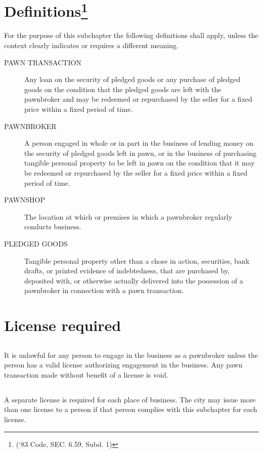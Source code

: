 
\setcounter{section}{29}
\section{Definitions\footnote{(‘83 Code, SEC. 6.59, Subd. 1)}}
For the purpose of this subchapter the following definitions shall apply, unless the context clearly indicates or requires a different meaning.
\begin{description}
    \item[PAWN TRANSACTION] Any loan on the security of pledged goods or any purchase of pledged goods on the condition that the pledged goods are left with the pawnbroker and may be redeemed or repurchased by the seller for a fixed price within a fixed period of time.
    \item[PAWNBROKER] A person engaged in whole or in part in the business of lending money on the security of pledged goods left in pawn, or in the business of purchasing tangible personal property to be left in pawn on the condition that it may be redeemed or repurchased by the seller for a fixed price within a fixed period of time.
    \item[PAWNSHOP] The location at which or premises in which a pawnbroker regularly conducts business.
    \item[PLEDGED GOODS] Tangible personal property other than a chose in action, securities, bank drafts, or printed evidence of indebtedness, that are purchased by, deposited with, or otherwise actually delivered into the possession of a pawnbroker in connection with a pawn transaction.
\end{description}

\section{License required}
\subsection{}
It is unlawful for any person to engage in the business as a pawnbroker unless the person has a valid license authorizing engagement in the business. Any pawn transaction made without benefit of a license is void.
\subsection{}
A separate license is required for each place of business. The city may issue more than one license to a person if that person complies with this subchapter for each license.
